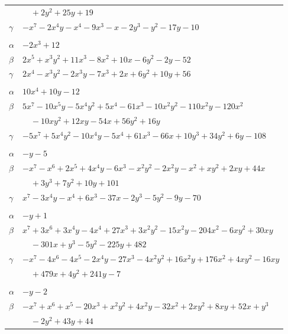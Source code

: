 \documentclass[11pt]{article}
\begin{document}
\begin{longtable}{@{}ll@{}}
 & $\quad +2y^{2}+25y+19$\\
$\gamma$ & $-x^{7}-2x^{4}y-x^{4}-9x^{3}-x-2y^{3}-y^{2}-17y-10$\\
\addlinespace[3pt]
\multicolumn{2}{@{}l}{$\{i,j\}=\{15,22\}$, $k_{ij}=2^{3}\cdot 3\cdot 5$}\\
$\alpha$ & $-2x^{3}+12$\\
$\beta$ & $2x^{5}+x^{3}y^{2}+11x^{3}-8x^{2}+10x-6y^{2}-2y-52$\\
$\gamma$ & $2x^{4}-x^{3}y^{2}-2x^{3}y-7x^{3}+2x+6y^{2}+10y+56$\\
\addlinespace[3pt]
\multicolumn{2}{@{}l}{$\{i,j\}=\{15,23\}$, $k_{ij}=2^{5}\cdot 3$}\\
$\alpha$ & $10x^{4}+10y-12$\\
$\beta$ & $5x^{7}-10x^{5}y-5x^{4}y^{2}+5x^{4}-61x^{3}-10x^{2}y^{2}-110x^{2}y-120x^{2}$\\
 & $\quad -10xy^{2}+12xy-54x+56y^{2}+16y$\\
$\gamma$ & $-5x^{7}+5x^{4}y^{2}-10x^{4}y-5x^{4}+61x^{3}-66x+10y^{3}+34y^{2}+6y-108$\\
\addlinespace[3pt]
\multicolumn{2}{@{}l}{$\{i,j\}=\{18,19\}$, $k_{ij}=2^{5}\cdot 3$}\\
$\alpha$ & $-y-5$\\
$\beta$ & $-x^{7}-x^{6}+2x^{5}+4x^{4}y-6x^{3}-x^{2}y^{2}-2x^{2}y-x^{2}+xy^{2}+2xy+44x$\\
 & $\quad +3y^{3}+7y^{2}+10y+101$\\
$\gamma$ & $x^{7}-3x^{4}y-x^{4}+6x^{3}-37x-2y^{3}-5y^{2}-9y-70$\\
\addlinespace[3pt]
\multicolumn{2}{@{}l}{$\{i,j\}=\{19,25\}$, $k_{ij}=3\cdot 5$}\\
$\alpha$ & $-y+1$\\
$\beta$ & $x^{7}+3x^{6}+3x^{4}y-4x^{4}+27x^{3}+3x^{2}y^{2}-15x^{2}y-204x^{2}-6xy^{2}+30xy$\\
 & $\quad -301x+y^{3}-5y^{2}-225y+482$\\
$\gamma$ & $-x^{7}-4x^{6}-4x^{5}-2x^{4}y-27x^{3}-4x^{2}y^{2}+16x^{2}y+176x^{2}+4xy^{2}-16xy$\\
 & $\quad +479x+4y^{2}+241y-7$\\
\addlinespace[3pt]
\multicolumn{2}{@{}l}{$\{i,j\}=\{20,21\}$, $k_{ij}=2\cdot 3$}\\
$\alpha$ & $-y-2$\\
$\beta$ & $-x^{7}+x^{6}+x^{5}-20x^{3}+x^{2}y^{2}+4x^{2}y-32x^{2}+2xy^{2}+8xy+52x+y^{3}$\\
 & $\quad -2y^{2}+43y+44$\\

\end{longtable}
\end{document}

